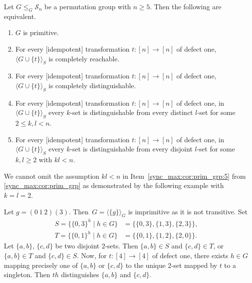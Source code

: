 \begin{corollary}
\label{sync_max:cor:prim_grp}
	Let $G \le_G \mathcal S_n$ be a permutation group with $n \ge 5$. Then the following are equivalent.	
\begin{enumerate}
\item \label{sync_max:cor:prim:item:prim} $G$ is primitive.

\item \label{sync_max:cor:prim:item:compl_reach} 
 For every [idempotent] transformation $t \colon [n] \to [n]$ of defect one, $\langle G \cup \{t\} \rangle_S$ is completely reachable.

\item For every [idempotent] transformation $t \colon [n] \to [n]$ of defect one, $\langle G \cup \{t\} \rangle_S$ is completely distinguishable.

\item \label{sync_max:cor:prim_grp:4} For every [idempotent] transformation $t \colon [n] \to [n]$ of defect one, in $\langle G \cup \{t\} \rangle_S$ every $k$-set is distinguishable from every distinct $l$-set
for some $2 \le k,l < n$.

\item \label{sync_max:cor:prim_grp:5} For every [idempotent] transformation $t \colon [n] \to [n]$ of defect one, 
in $\langle G \cup \{t\} \rangle_S$ every $k$-set is distinguishable from every disjoint $l$-set
for some $k,l \ge 2$ with $kl < n$.
\end{enumerate}
\end{corollary}

We cannot omit the assumption $kl< n$ in Item~\ref{sync_max:cor:prim_grp:5} 
from \cref{sync_max:cor:prim_grp} as demonstrated by the following example with $k = l = 2$.

\begin{example}
	Let $g = (0 ~ 1 ~ 2)(3)$. 
	Then~$G = \langle \{g\} \rangle_G$ is imprimitive as it is not transitive.	
    Set
	\begin{align*}
		S = \{ \{0,3\}^h \mid h \in G \} & = \{ \{0,3\}, \{1,3\}, \{2,3\} \}, \\
		T = \{ \{0,1\}^h \mid h \in G \} & = \{ \{0,1\}, \{1,2\}, \{2,0\} \}.
	\end{align*}
    Let $\{a,b\}$, $\{c,d\}$ be two disjoint $2$-sets.
    Then $\{a,b\} \in S$ and $\{c,d\} \in T$, or
    $\{a,b\} \in T$ and $\{c,d\} \in S$.
    Now, for $t \colon [4] \to [4]$ of defect one,
    there exists $h \in G$
    mapping precisely one of $\{a,b\}$ or $\{c,d\}$
    to the unique $2$-set
    mapped by $t$ to a singleton.
    Then $th$ distinguishes $\{a,b\}$ and $\{c,d\}$.
\end{example}